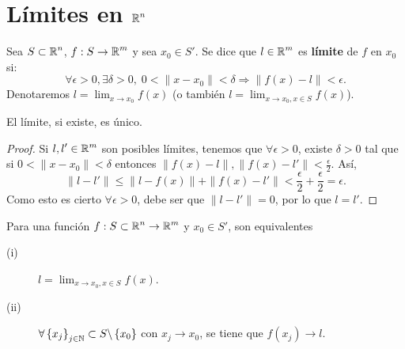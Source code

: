 \chapter{Límites en $\displaystyle \mathbb{R}^{n} $}
\begin{definition}[Límite]
Sea $\displaystyle S \subset \mathbb{R}^{n} $, $\displaystyle f : S \to \mathbb{R}^{m} $ y sea $\displaystyle x_{0} \in S' $. Se dice que $\displaystyle l \in \mathbb{R}^{m} $ es \textbf{límite} de $\displaystyle f $ en $\displaystyle x_{0} $ si:
\[\forall \epsilon > 0, \exists\delta > 0, \; 0 < \|x-x_{0}\| < \delta \Rightarrow \|f\left(x\right)-l\|<\epsilon  .\]
Denotaremos $\displaystyle  l = \lim_{x \to x_{0}}f\left(x\right) $ (o también $\displaystyle l = \lim_{x \to x_{0}, x \in S}f\left(x\right) $). 
\end{definition}
\begin{prop}
El límite, si existe, es único.
\end{prop}
\begin{proof}
Si $\displaystyle l,l' \in \mathbb{R}^{m} $ son posibles límites, tenemos que $\displaystyle \forall \epsilon > 0 $, existe $\displaystyle \delta > 0 $ tal que si $\displaystyle 0 < \| x - x_{0}\| < \delta  $ entonces $\displaystyle \|f\left(x\right) -l\|,\|f\left(x\right)-l'\| < \frac{\epsilon }{2} $. Así,
\[ \| l - l'\| \leq \|l - f\left(x\right)\| + \|f\left(x\right)-l'\| < \frac{\epsilon }{2} + \frac{\epsilon }{2} = \epsilon  .\]
Como esto es cierto $\displaystyle \forall \epsilon > 0 $, debe ser que $\displaystyle \| l - l'\| = 0 $, por lo que $\displaystyle l = l' $.
\end{proof}
\begin{prop}
	Para una función $\displaystyle f : S \subset \mathbb{R}^{n} \to \mathbb{R}^{m} $ y $\displaystyle x_{0} \in S' $, son equivalentes
	\begin{description}
	\item[(i)] $\displaystyle l = \lim_{x \to x_{0}, x \in S}f\left(x\right) $. 
	\item[(ii)] $\displaystyle \forall \left\{ x_{j}\right\} _{j\in \mathbb{N}}\subset S \backslash \left\{ x_{0}\right\}  $ con $\displaystyle x_{j} \to x_{0} $, se tiene que $\displaystyle f\left(x_{j}\right) \to l $.
	\end{description}
\end{prop}
